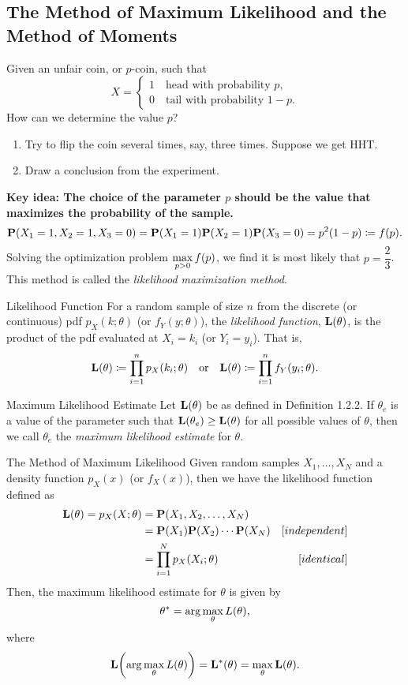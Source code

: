 \subsection{The Method of Maximum Likelihood and the Method of Moments}
\begin{eg}
	Given an unfair coin, or $p$-coin, such that \[X=\begin{cases}1\quad\text{head with probability }p,\\0\quad\text{tail with probability }1-p.\end{cases}\]	How can we determine the value $p$?
	\begin{sol}
		\begin{enumerate}
			\item Try to flip the coin several times, say, three times. Suppose we get HHT. 
			\item Draw a conclusion from the experiment. 
		\end{enumerate}	
		\textbf{Key idea: The choice of the parameter $p$ should be the value that maximizes the probability of the sample.}
		\[\vb{P}\qty(X_1=1,X_2=1,X_3=0)=\vb{P}\qty(X_1=1)\vb{P}(X_2=1)\vb{P}(X_3=0)=p^2(1-p)\coloneqq f(p).\] Solving the optimization problem $\displaystyle\max_{p>0}f(p)$, we find it is most likely that $p=\dfrac{2}{3}$. This method is called the \textit{likelihood maximization method}.
	\end{sol}
\end{eg}
\begin{df}{Likelihood Function}
	For a random sample of size $n$ from the discrete (or continuous) pdf $p_X(k;\theta)$ (or $f_Y(y;\theta)$), the \textit{likelihood function}, $\vb{L}(\theta)$, is the product of the pdf evaluated at $X_i=k_i$ (or $Y_i=y_i$). That is, \[\vb{L}(\theta)\coloneqq\prod_{i=1}^np_X\qty(k_i;\theta)\quad\text{or}\quad \vb{L}(\theta)\coloneqq\prod_{i=1}^nf_Y\qty(y_i;\theta).\]	
\end{df}
\begin{df}{Maximum Likelihood Estimate}
	Let $\vb{L}(\theta)$ be as defined in Definition 1.2.2. If $\theta_e$ is a value of the parameter such that $\vb{L}\qty(\theta_e)\geq \vb{L}(\theta)$ for all possible values of $\theta$, then we call $\theta_e$ the \textit{maximum likelihood estimate} for $\theta$.
\end{df}
\begin{thm}{The Method of Maximum Likelihood}
	Given random samples $X_1,\dots,X_N$ and a density function $p_X(x)$ (or $f_X(x)$), then we have the likelihood function defined as \begin{align*}\vb{L}(\theta)=p_X(X;\theta)&=\vb{P}(X_1,X_2,\dots,X_N)\\&=\vb{P}(X_1)\vb{P}(X_2)\cdots\vb{P}(X_N)&[independent]\\&=\prod_{i=1}^Np_X(X_i;\theta)&[identical]\end{align*} Then, the maximum likelihood estimate for $\theta$ is given by \[\theta^*=\arg\max_\theta L(\theta),\] where \[\vb{L}\qty(\arg\max_\theta L(\theta))=\vb{L}^*(\theta)=\max_\theta \vb{L}(\theta).\]
\end{thm}
